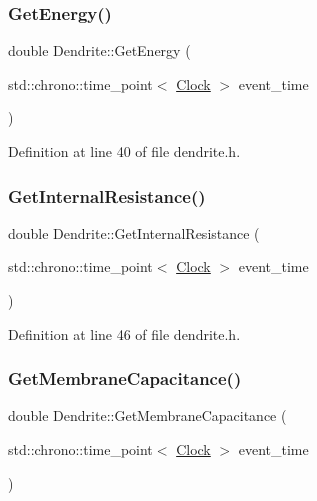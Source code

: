 \subsubsection{\texorpdfstring{Get\+Energy()}{GetEnergy()}}
{\footnotesize\ttfamily double Dendrite\+::\+Get\+Energy (\begin{DoxyParamCaption}\item[{std\+::chrono\+::time\+\_\+point$<$ \hyperlink{universe_8h_a0ef8d951d1ca5ab3cfaf7ab4c7a6fd80}{Clock} $>$}]{event\+\_\+time }\end{DoxyParamCaption})\hspace{0.3cm}{\ttfamily [inline]}}



Definition at line 40 of file dendrite.\+h.

\mbox{\label{class_dendrite_a7dd00ac5440edf9943389951a275b9bc}} 
\subsubsection{\texorpdfstring{Get\+Internal\+Resistance()}{GetInternalResistance()}}
{\footnotesize\ttfamily double Dendrite\+::\+Get\+Internal\+Resistance (\begin{DoxyParamCaption}\item[{std\+::chrono\+::time\+\_\+point$<$ \hyperlink{universe_8h_a0ef8d951d1ca5ab3cfaf7ab4c7a6fd80}{Clock} $>$}]{event\+\_\+time }\end{DoxyParamCaption})\hspace{0.3cm}{\ttfamily [inline]}}



Definition at line 46 of file dendrite.\+h.

\mbox{\label{class_dendrite_a3551fe5fcf9c7ec767a6171f61a5ba51}} 
\subsubsection{\texorpdfstring{Get\+Membrane\+Capacitance()}{GetMembraneCapacitance()}}
{\footnotesize\ttfamily double Dendrite\+::\+Get\+Membrane\+Capacitance (\begin{DoxyParamCaption}\item[{std\+::chrono\+::time\+\_\+point$<$ \hyperlink{universe_8h_a0ef8d951d1ca5ab3cfaf7ab4c7a6fd80}{Clock} $>$}]{event\+\_\+time }\end{DoxyParamCaption})\hspace{0.3cm}{\ttfamily [inline]}}



